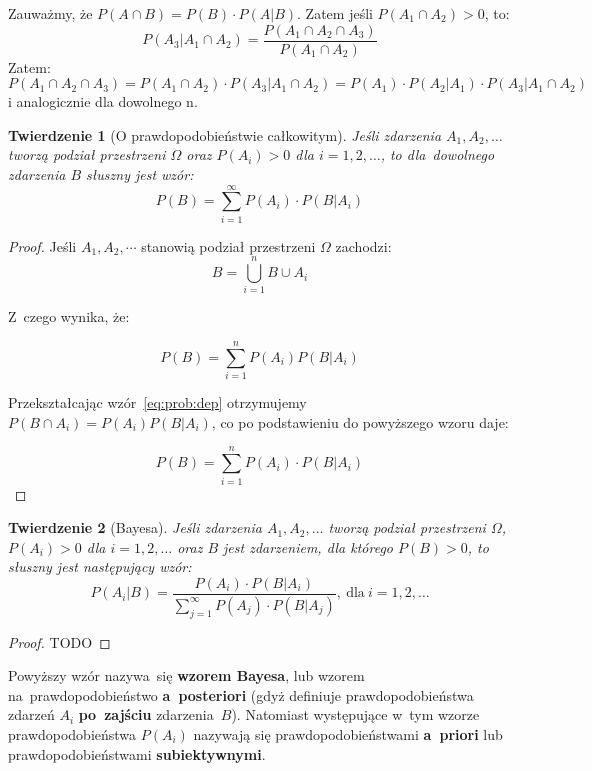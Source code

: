 \documentclass[10pt,a4paper]{article}
\newtheorem{theorem}{Twierdzenie}[section]
\begin{document}
Zauważmy, że $P(A\cap B)=P(B)\cdot P(A|B)$. Zatem jeśli $P(A_1\cap A_2)>0$, to:
\[
  P(A_3|A_1\cap A_2)=\frac{P(A_1\cap A_2 \cap A_3)}{P(A_1\cap A_2)}
\]
Zatem:
\[
  P(A_1\cap A_2 \cap A_3) = P(A_1\cap A_2)\cdot P(A_3|A_1\cap A_2) = P(A_1)
  \cdot P(A_2|A_1)\cdot P(A_3|A_1\cap A_2)
\]
i analogicznie dla dowolnego n.

\begin{theorem}[O prawdopodobieństwie całkowitym]
  Jeśli zdarzenia $A_1,A_2,\dotsc$ tworzą podział przestrzeni $\Omega$ oraz
  $P(A_i)>0$ dla $i=1,2,\dotsc$, to dla~dowolnego zdarzenia $B$ słuszny jest
  wzór:
  \begin{equation}
    \label{eq:prob:sum}
    P(B) = \sum_{i=1}^{\infty} P(A_i)\cdot P(B|A_i)
  \end{equation}
\end{theorem}
\begin{proof}
  Jeśli $A_1,A_2,\cdots$ stanowią podział przestrzeni $\Omega$ zachodzi:
  \[
    B = \bigcup_{i=1}^n B \cup A_i
  \]

  Z~czego wynika, że:

  \[
    P(B) = \sum_{i=1}^n P(A_i)P(B|A_i)
  \]

  Przekształcając wzór~\ref{eq:prob:dep} otrzymujemy $P(B \cap A_i) = P(A_i)
  P(B|A_i)$, co po podstawieniu do powyższego wzoru daje:

  \begin{equation}
    P(B) = \sum_{i=1}^{n} P(A_i)\cdot P(B|A_i)
  \end{equation}
\end{proof}

\begin{theorem}[Bayesa]
  Jeśli zdarzenia $A_1,A_2,\dotsc$ tworzą podział przestrzeni $\Omega$,
  $P(A_i)>0$ dla $i=1,2,\dotsc$ oraz $B$ jest zdarzeniem, dla którego $P(B)>0$,
  to słuszny jest następujący wzór:
  \begin{equation}
    P(A_i|B) = \frac{P(A_i)\cdot P(B|A_i)}{\sum_{j=1}^{\infty}P(A_j)\cdot
      P(B|A_j)},\:\textrm{dla}\:i=1,2,\dotsc
  \end{equation}
\end{theorem}
\begin{proof}
  TODO
\end{proof}

Powyższy wzór nazywa~się \textbf{wzorem Bayesa}, lub wzorem na~prawdopodobieństwo
\textbf{a~posteriori} (gdyż definiuje prawdopodobieństwa zdarzeń $A_i$
\textbf{po~zajściu} zdarzenia~$B$). Natomiast występujące w~tym wzorze
prawdopodobieństwa $P(A_i)$ nazywają się prawdopodobieństwami \textbf{a~priori}
lub prawdopodobieństwami \textbf{subiektywnymi}.
\end{document}
